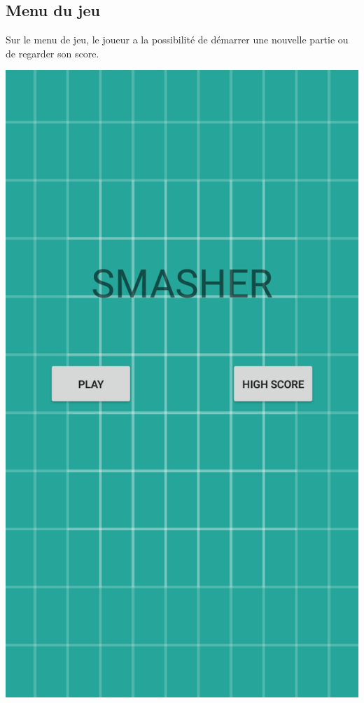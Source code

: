 \documentclass[a4paper]{article}
\begin{document}
\subsection{Menu du jeu}
Sur le menu de jeu, le joueur a la possibilité de démarrer une nouvelle partie ou de regarder son score.
\begin{center}
  \includegraphics[scale=0.20]{images/1.png}
\end{center}

\newpage
\end{document}
